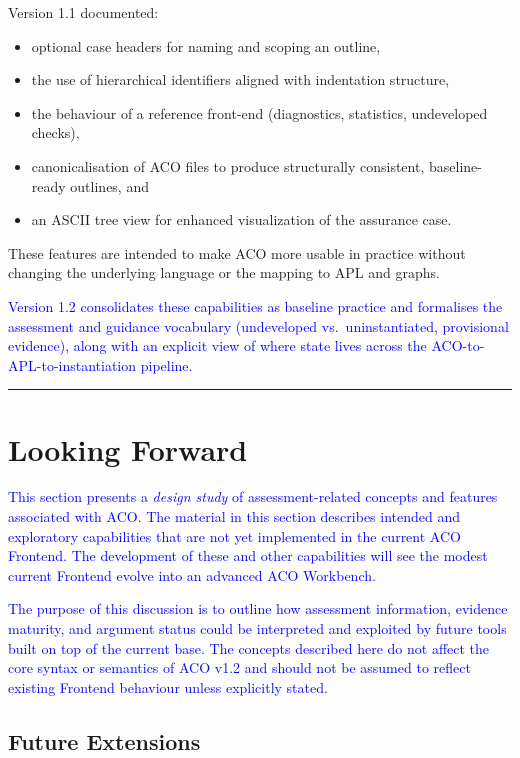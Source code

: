 \documentclass[11pt,twoside,a4paper]{article}
\begin{document}
Version 1.1 documented:
\begin{itemize}[leftmargin=2em]
  \item optional case headers for naming and scoping an outline,
  \item the use of hierarchical identifiers aligned with indentation structure,
  \item the behaviour of a reference front-end (diagnostics, statistics, undeveloped checks),
  \item canonicalisation of ACO files to produce structurally consistent, baseline-ready outlines, and
  \item an ASCII tree view for enhanced visualization of the assurance case.
\end{itemize}
These features are intended to make ACO more usable in practice without changing the underlying language or the mapping to APL and graphs.

\textcolor{blue}{Version 1.2 consolidates these capabilities as baseline practice and formalises the assessment and guidance vocabulary (undeveloped vs.\ uninstantiated, provisional evidence), along with an explicit view of where state lives across the ACO-to-APL-to-instantiation pipeline.}

\bigskip
\hrule
\bigskip

\section{Looking Forward}

\textcolor{blue}{This section presents a \emph{design study} of assessment-related concepts and features associated with ACO. The material in this section describes intended and
exploratory capabilities that are not yet implemented in the current ACO Frontend.
The development of these and other capabilities will see the modest current Frontend evolve into an advanced ACO Workbench.}

\textcolor{blue}{The purpose of this discussion is to outline how assessment information, evidence
maturity, and argument status could be interpreted and exploited by future tools
built on top of the current base. The concepts described here do not affect the core
syntax or semantics of ACO v1.2 and should not be assumed to reflect existing
Frontend behaviour unless explicitly stated.}

\subsection{Future Extensions}
\label{sec:future-extensions}
\end{document}
